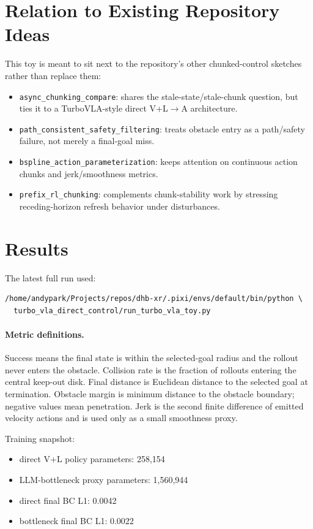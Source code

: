 \documentclass[11pt]{article}
\begin{document}
\section{Relation to Existing Repository Ideas}

This toy is meant to sit next to the repository's other chunked-control sketches rather than replace them:
\begin{itemize}[leftmargin=1.5em]
  \item \texttt{async\_chunking\_compare}: shares the stale-state/stale-chunk question, but ties it to a TurboVLA-style direct V+L\(\rightarrow\)A architecture.
  \item \texttt{path\_consistent\_safety\_filtering}: treats obstacle entry as a path/safety failure, not merely a final-goal miss.
  \item \texttt{bspline\_action\_parameterization}: keeps attention on continuous action chunks and jerk/smoothness metrics.
  \item \texttt{prefix\_rl\_chunking}: complements chunk-stability work by stressing receding-horizon refresh behavior under disturbances.
\end{itemize}

\section{Results}

The latest full run used:
\begin{verbatim}
/home/andypark/Projects/repos/dhb-xr/.pixi/envs/default/bin/python \
  turbo_vla_direct_control/run_turbo_vla_toy.py
\end{verbatim}

\paragraph{Metric definitions.}
Success means the final state is within the selected-goal radius and the rollout never enters the obstacle. Collision rate is the fraction of rollouts entering the central keep-out disk. Final distance is Euclidean distance to the selected goal at termination. Obstacle margin is minimum distance to the obstacle boundary; negative values mean penetration. Jerk is the second finite difference of emitted velocity actions and is used only as a small smoothness proxy.

Training snapshot:
\begin{itemize}[leftmargin=1.5em]
  \item direct V+L policy parameters: 258,154
  \item LLM-bottleneck proxy parameters: 1,560,944
  \item direct final BC L1: 0.0042
  \item bottleneck final BC L1: 0.0022
\end{itemize}
\end{document}
